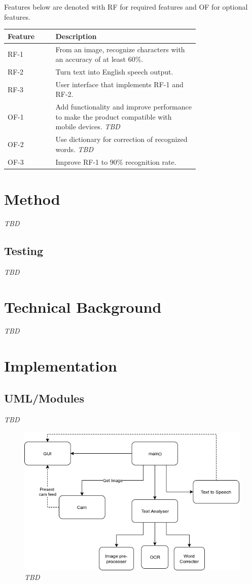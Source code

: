 \documentclass[a4paper, english]{scrartcl}
\begin{document}
Features below are denoted with RF for required features and OF for optional
features.
  \noindent\begin{tabularx}{\linewidth}{X p{0.75\linewidth}}
  \toprule
    \textbf{Feature} & \textbf{Description} \\
  \midrule
  RF-1 &
    From an image, recognize characters with an accuracy of at least 60\%. \\
  RF-2 &
    Turn text into English speech output. \\
  RF-3 &
    User interface that implements RF-1 and RF-2. \\
  OF-1 &
    Add functionality and improve performance to make the product compatible
    with mobile devices. \textit{TBD} \\
  OF-2 &
    Use dictionary for correction of recognized words. \textit{TBD} \\
  OF-3 &
    Improve RF-1 to 90\% recognition rate. \\
  \bottomrule
  \end{tabularx}

\section{Method}
\textit{TBD}

\subsection{Testing}
\textit{TBD}

\section{Technical Background}
\textit{TBD}

\section{Implementation}

\subsection{UML/Modules}
\textit{TBD}
\begin{figure}[h!]
  \centering
  \caption{\textit{TBD}}\label{fig:ex1a}
  \includegraphics[width=1.0\textwidth]{res/UML1}
\end{figure}
\end{document}
